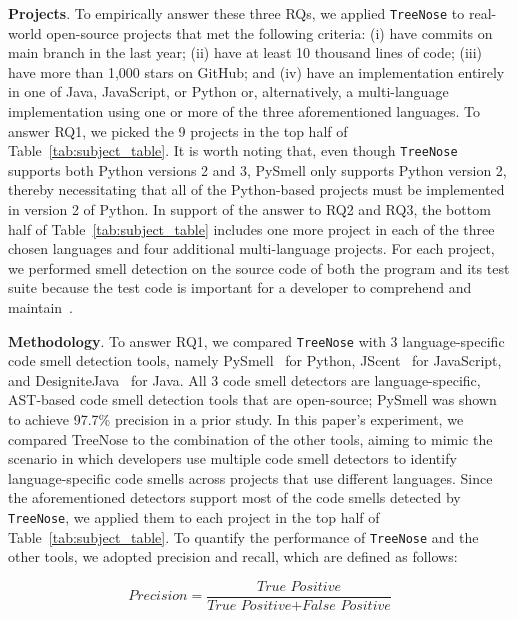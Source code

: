 {\bf Projects}. To empirically answer these three RQs, we applied
\texttt{TreeNose} to real-world open-source projects that met the following
criteria: (i) have commits on main branch in the last year; (ii) have at least
10 thousand lines of code; (iii) have more than 1,000 stars on GitHub; and (iv)
have an implementation entirely in one of Java, JavaScript, or Python or,
alternatively, a multi-language implementation using one or more of the three
aforementioned languages.
%
To answer RQ1, we picked the 9 projects in the top half of
Table~\ref{tab:subject_table}.
%
It is worth noting that, even though \texttt{TreeNose} supports both Python
versions 2 and 3, PySmell only supports Python version 2, thereby necessitating
that all of the Python-based projects must be implemented in version 2 of
Python.
%
In support of the answer to RQ2 and RQ3, the bottom half of
Table~\ref{tab:subject_table} includes one more project in each of the three
chosen languages and four additional multi-language projects.
%
For each project, we performed smell detection on the source code of both the
program and its test suite because the test code is important for a developer
to comprehend and maintain~\cite{ML}.



{\bf Methodology}. To answer RQ1, we compared \texttt{TreeNose} with 3
language-specific code smell detection tools, namely PySmell~\cite{Pysmell} for
Python, JScent~\cite{Jscent} for JavaScript, and
DesigniteJava~\cite{DesigniteJava} for Java. All 3 code smell detectors are
language-specific, AST-based code smell detection tools that are open-source;
PySmell was shown to achieve 97.7\% precision in a prior study.
%
In this paper's experiment, we compared TreeNose to the combination of the
other tools, aiming to mimic the scenario in which developers use multiple code
smell detectors to identify language-specific code smells across projects that
use different languages.
%
Since the aforementioned detectors support most of the code smells detected by
\texttt{TreeNose}, we applied them to each project in the top half of
Table~\ref{tab:subject_table}. To quantify the performance of \texttt{TreeNose}
and the other tools, we adopted precision and recall, which are defined as
follows:

\begin{equation}
    \textit{Precision} = \frac{\textit{True Positive}}{\textit{True Positive} + \textit{False Positive}}
\end{equation}

